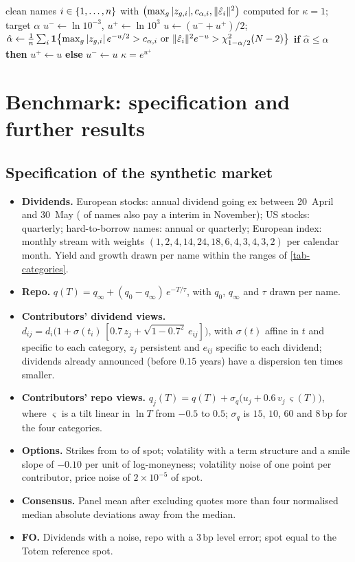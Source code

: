 \begin{algorithm}[H]
\caption{Calibration of the scale $\kappa$}\label{alg-kappa}
\begin{algorithmic}[1]
\Require clean names $i\in\{1,\dots,n\}$ with $\bigl(\max_g|z_{g,i}|, c_{\alpha,i}, \lVert \hat\varepsilon_i\rVert^2\bigr)$ computed for
$\kappa=1$; target $\alpha$
\State $u^-\gets\ln10^{-3}$, $u^+\gets\ln10^{3}$
  \State $u\gets(u^-+u^+)/2$; $\hat\alpha\gets\frac1n\sum_i\one\bigl\{\max_g|z_{g,i}|\,e^{-u/2}>c_{\alpha,i}\ \text{or}\
  \norm{\eh_i}^2e^{-u}>\chi^2_{1-\alpha/2}(N-2)\bigr\}$
  \State \textbf{if} $\hat\alpha\le\alpha$ \textbf{then} $u^+\gets u$ \textbf{else} $u^-\gets u$
\EndFor
\State \Return $\kappa=e^{u^+}$
\end{algorithmic}
\end{algorithm}

\section{Benchmark: specification and further results}\label{app-synthetic}
\subsection{Specification of the synthetic market}
\begin{itemize}
\item \textbf{Dividends.} European stocks: annual dividend going ex between 20~April and 30~May ( of names
also pay a \pct{40} interim in November); US stocks: quarterly; hard-to-borrow names: annual or quarterly; European
index: monthly stream with weights $(1, 2, 4, 14, 24, 18, 6, 4, 3, 4, 3, 2)$ per calendar month. Yield and growth drawn
per name within the ranges of \cref{tab-categories}.
\item \textbf{Repo.} $q(T)=q_\infty+(q_0-q_\infty)\,e^{-T/\tau}$, with $q_0$, $q_\infty$ and $\tau$ drawn per name.
\item \textbf{Contributors' dividend views.}
$d_{ij}=d_i\bigl(1+\sigma(t_i)\,[\num{0.7}\,z_j+\sqrt{1-\num{0.7}^2}\,e_{ij}]\bigr)$, with $\sigma(t)$ affine in $t$ and
specific to each category, $z_j$ persistent and $e_{ij}$ specific to each dividend; dividends already announced (before
$\num{0.15}$ years) have a dispersion ten times smaller.
\item \textbf{Contributors' repo views.} $q_j(T)=q(T)+\sigma_q\bigl(u_j+\num{0.6}\,v_j\,\varsigma(T)\bigr)$, where
$\varsigma$ is a tilt linear in $\ln T$ from $\num{-0.5}$ to $\num{0.5}$; $\sigma_q$ is $15$, $10$, $60$ and $8$\,bp for
the four categories.
\item \textbf{Options.} Strikes from  to  of spot; volatility with a term structure and a smile slope
of $\num{-0.10}$ per unit of log-moneyness; volatility noise of one point per contributor, price noise of
$2\times10^{-5}$ of spot.
\item \textbf{Consensus.} Panel mean after excluding quotes more than four normalised median absolute deviations away
from the median.
\item \textbf{FO.} Dividends with a  noise, repo with a $3$\,bp level error; spot equal to the Totem reference
spot.
\end{itemize}

